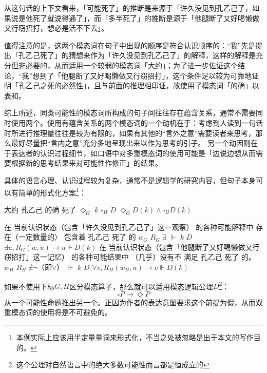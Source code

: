 \documentclass[fontset=ubuntu]{ctexart}
\newcommand{\textul}[1]{\makebox{\underline{#1}}}
\begin{document}
				从这句话的上下文看来，「可能死了」的推断是来源于「许久没见到孔乙己了，如果说是他死了就说得通了」，而「多半死了」的推断是源于「他腿断了又好喝懒做又行窃招打，想必是活不下去」。
				
				值得注意的是，这两个模态词在句子中出现的顺序是符合认识顺序的：“我”先是提出「孔乙己死了」的猜想来作为「许久没见到孔乙己了」的解释，这样的解释是充分但非必要的，从而适用一个较弱的模态词「大约」；为了进一步佐证这个结论，“我”想到了「他腿断了又好喝懒做又行窃招打」，这个条件足以较为可靠地证明「孔乙己之死的必然性」，且与前面的推理相印证，故使用了模态词「的确」以表\textul{高可能性}和\textul{确认}。

				综上所述，同类可能性的模态词所构成的句子间往往存在蕴含关系，通常不需要同时使用两个。使用有蕴含关系的两个模态词的一个动机在于：考虑到人读到一句话时所进行推理量往往是较为有限的，如果有其他的“言外之意”需要读者来思考，那么最好尽量把“言内之意”充分多地呈现出来以作为思考的引子。
				另一个动因则在于表达者的认识过程细节，如口语中对多重模态词的使用可能是「边说边想从而需要根据新的思考结果来对可能性作修正」的结果。

				具体的语言心理、认识过程较为复杂，通常不是逻辑学的研究内容，但句子本身可以有简单的形式化方案\footnote{本例实际上应该用半定量量词来形式化，不当之处被忽略是出于本文的写作目的。}：

				\begin{covexamples}
					\item 
						\gll 大约 孔乙己 的确 死了
							\(\Diamond_G\) \(k\) \(\square_H\) \(D\)
						\glt \(\Diamond_G D(k)\land\square_H D(k)\)
						\glend
					\item 
						\gll 在 当前认识状态（包含「许久没见到孔乙己了」这一观察） 的各种可能解释中 存在（一定数量的） 包含着 孔乙己 死了 的
							{} \(w_G\) \(R_G\) \(\exists\) \(\Vdash\) \(k\) \(D\) {}
						\glt \(\exists u,R_G(w,u)\to u\Vdash D(k)\)
						\glend
						\gll 在 当前认识状态（包含「他腿断了又好喝懒做又行窃招打」这一记忆） 的各种可能结果中 （几乎）没有不 满足 孔乙己 死了 的。
							{} \(w_H\) \(R_H\) \(\nexists\lnot\)（即\(\forall\)） \(\Vdash\) \(k\) \(D\) {}
						\glt \(\forall v,R_H(w_H,u)\to v\Vdash D(k)\)
						\glend
						
				\end{covexamples}

				如果不使用下标\(G,H\)区分模态算子，那么就可以适用模态逻辑公理\(D\)\footnote{这个公理对自然语言中的绝大多数可能性而言都是恒成立的}：
				\begin{equation}
					\square P\to\Diamond P
				\end{equation}
				从一个可能性命题推出另一个。正因为作者的表达意图要求这个前提为假，从而双重模态词的使用将是不可避免的。
\end{document}
